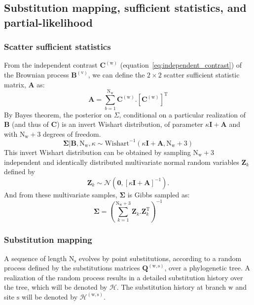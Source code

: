 \documentclass{article}
\newcommand{\submatrix}{Q}
\newcommand{\Submatrix}{\bm{\submatrix}}
\newcommand{\branch}{\text{w}}
\newcommand{\branchexp}{^{(\branch)}}
\newcommand{\Nbranch}{\text{N}_{\branch}}
\newcommand{\node}{\text{v}}
\newcommand{\site}{\text{s}}
\newcommand{\Nsite}{\text{N}_{\site}}
\newcommand{\branchsiteexp}{^{(\branch, \site)}}
\newcommand{\brownian}{\bm{B}}
\newcommand{\contrast}{\bm{C}}
\newcommand{\covariance}{\bm{\Sigma}}
\newcommand{\covariancekappa}{\kappa}
\newcommand{\history}{\mathcal{H}}
\begin{document}
\subsection{Substitution mapping, sufficient statistics, and partial-likelihood}

\subsubsection{Scatter sufficient statistics}

From the independent contrast $\contrast\branchexp$ (equation~\ref{eq:independent_contrast}) of the Brownian process $\brownian^{(\node)}$, we can define the $2 \times 2$  scatter sufficient statistic matrix, $\bm{A}$ as:
\begin{equation}
\bm{A} = \sum_{b=1}^{\Nbranch} \contrast\branchexp. \left[\contrast\branchexp\right]^{\mathrm{T}}
\end{equation}
By Bayes theorem, the posterior on $\Sigma$, conditional on a particular realization of $\brownian$ (and thus of $\contrast$) is an invert Wishart distribution, of parameter $\covariancekappa \bm{I} + \bm{A}$ and with $\Nbranch + 3$ degrees of freedom.
\begin{equation}
\covariance | \brownian, \Nbranch, \covariancekappa  \sim \mathrm{Wishart}^{-1}\left( \covariancekappa \bm{I} + \bm{A}, \Nbranch + 3\right)
\end{equation}
This invert Wishart distribution can be obtained by sampling $\Nbranch + 3$ independent and identically distributed multivariate normal random variables $\bm{Z}_{k}$ defined by
\begin{equation}
\bm{Z}_{k} \sim \mathcal{N} \left( \bm{0}, \left[\covariancekappa \bm{I} + \bm{A}\right]^{-1} \right).
\end{equation}
And from these multivariate samples, $\covariance$ is Gibbs sampled as:
\begin{equation}
\covariance = \left( \sum_{k=1}^{\Nbranch + 3} \bm{Z}_{k}.\bm{Z}_{k}^{\mathrm{T}} \right)^{-1}
\end{equation}

\subsubsection{Substitution mapping}

A sequence of length $\Nsite$ evolves by point substitutions, according to a random process defined by the substitutions matrices $\Submatrix\branchsiteexp$, over a phylogenetic tree.
A realization of the random process results in a detailed substitution history over the tree, which will be denoted by $\history$.
The substitution history at branch $\branch$ and site $\site$ will be denoted by $\history\branchsiteexp$.
\end{document}
